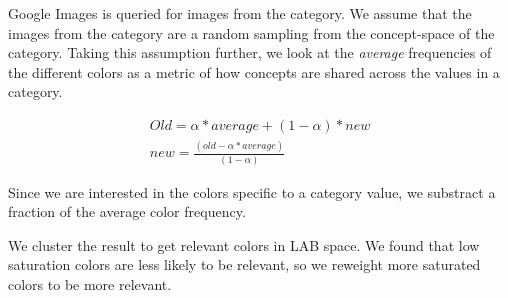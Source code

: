 Google Images is queried for images from  the category.
We assume that the images from the category are a random sampling from the concept-space of the category. Taking this assumption further, we look at the {\em average} frequencies of the different colors as a metric of how concepts are shared across the values in a category.

\begin{align}
Old = \alpha*average + (1-\alpha)*new \\
  new = \frac{(old - \alpha*average)}{(1-\alpha)} 
\end{align}

Since we are interested in the colors specific to a category value, we substract a fraction of the average color frequency. 

We cluster the result to get relevant colors in LAB space. We found that low saturation colors are less likely to be relevant, 
so we reweight more saturated colors to be more relevant.
